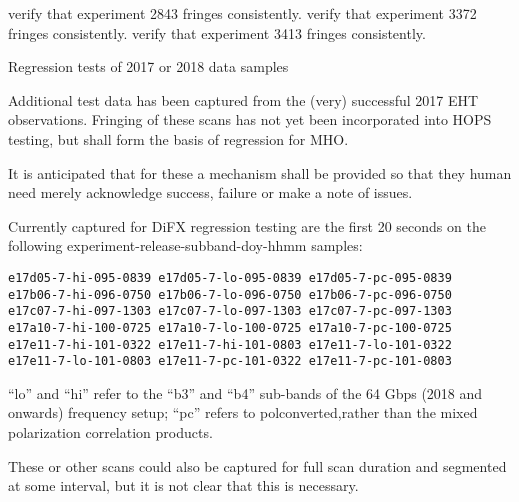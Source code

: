 \begin{description}
 verify that experiment 2843 fringes consistently.
 verify that experiment 3372 fringes consistently.
 verify that experiment 3413 fringes consistently.

 Regression tests of 2017 or 2018 data samples

\end{description}

Additional test data has been captured from the (very) successful
2017 \ac{EHT} observations.  Fringing of these scans has not yet
been incorporated into \ac{HOPS} testing, but shall form the basis
of regression for \ac{MHO}.  \FIXME[elaborate]

It is anticipated that for these a mechanism shall be provided
so that they human need merely acknowledge success, failure or
make a note of issues.

Currently captured for \acs{DiFX} regression testing are the first 20 seconds
on the following experiment-release-subband-doy-hhmm samples:
\begin{verbatim}
e17d05-7-hi-095-0839 e17d05-7-lo-095-0839 e17d05-7-pc-095-0839
e17b06-7-hi-096-0750 e17b06-7-lo-096-0750 e17b06-7-pc-096-0750
e17c07-7-hi-097-1303 e17c07-7-lo-097-1303 e17c07-7-pc-097-1303
e17a10-7-hi-100-0725 e17a10-7-lo-100-0725 e17a10-7-pc-100-0725
e17e11-7-hi-101-0322 e17e11-7-hi-101-0803 e17e11-7-lo-101-0322
e17e11-7-lo-101-0803 e17e11-7-pc-101-0322 e17e11-7-pc-101-0803
\end{verbatim}
``lo'' and ``hi'' refer to the ``b3'' and ``b4'' sub-bands of the
64 \acs{Gbps} (2018 and onwards) frequency setup; ``pc'' refers to polconverted,rather than the mixed polarization correlation products.

\TBC{}

These or other scans could also be captured for full scan duration and
segmented at some interval, but it is not clear that this is necessary.


